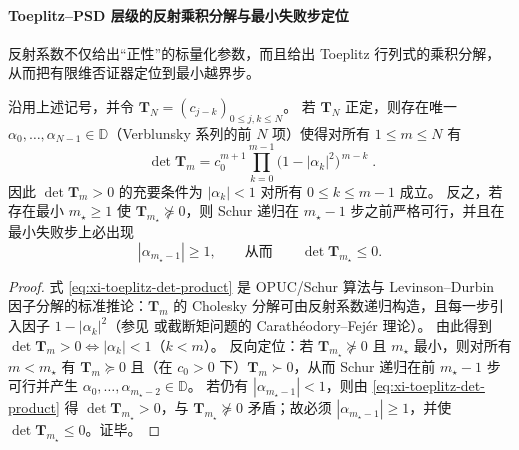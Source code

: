 \paragraph{Toeplitz--PSD 层级的反射乘积分解与最小失败步定位}
反射系数不仅给出“正性”的标量化参数，而且给出 Toeplitz 行列式的乘积分解，从而把有限维否证器定位到最小越界步。

\begin{theorem}\label{thm:xi-toeplitz-det-verblunsky}
沿用上述记号，并令 \(\mathbf{T}_N=(c_{j-k})_{0\le j,k\le N}\)。
若 \(\mathbf{T}_N\) 正定，则存在唯一 \(\alpha_0,\dots,\alpha_{N-1}\in\mathbb{D}\)（Verblunsky 系列的前 \(N\) 项）使得对所有 \(1\le m\le N\) 有
\begin{equation}\label{eq:xi-toeplitz-det-product}
\boxed{\;
\det \mathbf{T}_m
=c_0^{m+1}\prod_{k=0}^{m-1}\bigl(1-|\alpha_k|^2\bigr)^{\,m-k}\; }.
\end{equation}
因此 \(\det \mathbf{T}_m>0\) 的充要条件为 \(|\alpha_k|<1\) 对所有 \(0\le k\le m-1\) 成立。
反之，若存在最小 \(m_\star\ge 1\) 使 \(\mathbf{T}_{m_\star}\not\succeq 0\)，则 Schur 递归在 \(m_\star-1\) 步之前严格可行，并且在最小失败步上必出现
\[
|\alpha_{m_\star-1}|\ge 1,
\qquad\text{从而}\qquad
\det \mathbf{T}_{m_\star}\le 0.
\]
\end{theorem}

\begin{proof}
式 \eqref{eq:xi-toeplitz-det-product} 是 OPUC/Schur 算法与 Levinson--Durbin 因子分解的标准推论：\(\mathbf{T}_m\) 的 Cholesky 分解可由反射系数递归构造，且每一步引入因子 \(1-|\alpha_k|^2\)（参见 \cite[Ch.~1--2]{Simon2005OPUC1} 或截断矩问题的 Carath\'eodory--Fej\'er 理论）。
由此得到 \(\det \mathbf{T}_m>0 \Longleftrightarrow |\alpha_k|<1\)（\(k<m\)）。
反向定位：若 \(\mathbf{T}_{m_\star}\not\succeq 0\) 且 \(m_\star\) 最小，则对所有 \(m<m_\star\) 有 \(\mathbf{T}_m\succeq 0\) 且（在 \(c_0>0\) 下）\(\mathbf{T}_m\succ 0\)，从而 Schur 递归在前 \(m_\star-1\) 步可行并产生 \(\alpha_0,\dots,\alpha_{m_\star-2}\in\mathbb{D}\)。
若仍有 \(|\alpha_{m_\star-1}|<1\)，则由 \eqref{eq:xi-toeplitz-det-product} 得 \(\det\mathbf{T}_{m_\star}>0\)，与 \(\mathbf{T}_{m_\star}\not\succeq 0\) 矛盾；故必须 \(|\alpha_{m_\star-1}|\ge 1\)，并使 \(\det\mathbf{T}_{m_\star}\le 0\)。证毕。
\end{proof}

